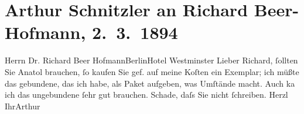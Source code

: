 

         
         \renewcommand{\erwaehntePersonen}{Personen: Richard Beer-Hofmann}
         \renewcommand{\erwaehnteOrte}{Orte: Berlin, Hotel Westminster, IX., Alsergrund, Wien}
         \renewcommand{\erwaehnteWerke}{Werke: Anatol}
               \section[Arthur Schnitzler an Richard Beer-Hofmann, 2. 3. 1894]{ Arthur Schnitzler an Richard Beer-Hofmann, 2. 3. 1894}\nopagebreak{}\rehead{ }\begin{ledgroupsized}[t]{13cm}\normalsize\beginnumbering \toendnotes[C]{\smallbreak\pagebreak[2]} 
\pstart{}{\pb}Herrn Dr. Richard Beer Hofmann\pend{}\pstart{}Berlin\pend{}\pstart{}Hotel Westminster\pend{}{\bigskip}\pstart
           \noindent{}{\pb}Lieber Richard, ſollten Sie Anatol brauchen, ſo kaufen Sie gef. auf meine
               Koſten ein Exemplar; ich müßte das gebundene, das ich habe, als Paket aufgeben, was
               Umſtände macht. Auch ka{\geminationn} ich das ungebundene ſehr gut
               brauchen. Schade, daſs Sie nicht ſchreiben.\pend
           \pstart Herzl Ihr\spacefill\mbox{Arthur}\pend{}
         
         \endnumbering{}\end{ledgroupsized}  \newcommand{\dateiname}{L00303}\newcommand{\titel}{Arthur Schnitzler an Richard Beer-Hofmann, 2. 3. 1894}\newcommand{\editorInnen}{Martin Anton Müller und Gerd-Hermann Susen}
      
